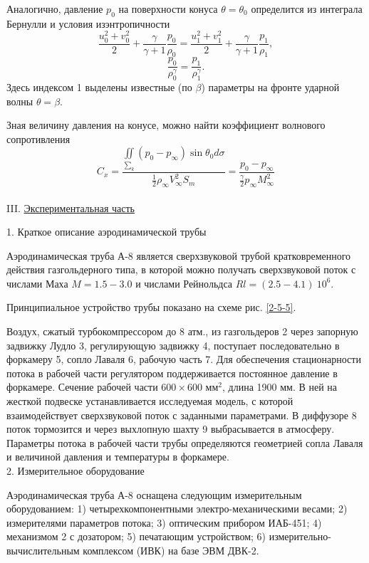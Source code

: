 \documentclass[specialist, subf, href, colorlinks=true, 14pt, final]{disser}
\theoremstyle{definition}
\newcommand{\npart}[2]{\noindent #1. \underline{#2}}
\begin{document}
Аналогично, давление $p_0$ на поверхности конуса $\theta = \theta_0$ определится из интеграла Бернулли и условия изэнтропичности
\[
  \frac{u_0^2 + v_0^2}{2} + \frac{\gamma}{\gamma + 1} \frac{p_0}{\rho_0} = \frac{u_1^2 + v_1^2}{2} + \frac{\gamma}{\gamma + 1}\frac{p_1}{\rho_1},
\]
\[
  \frac{p_0}{\rho_0^{\gamma}} = \frac{p_1}{\rho_1^{\gamma}}.
\]
Здесь индексом 1 выделены известные (по $\beta$) параметры на фронте ударной волны $\theta = \beta$.

Зная величину давления на конусе, можно найти коэффициент волнового сопротивления
\[
  C_x = \frac{\iint\limits_{\sum_k}(p_0 - p_{\infty})\sin \theta_0 d \sigma}{\displaystyle \frac{1}{2} \rho_{\infty} V^2_{\infty} S_m} = \frac{p_0 - p_{\infty}}{\displaystyle \frac{\gamma}{2} p_{\infty} M^2_{\infty}}
\]
\\
\npart{III}{Экспериментальная часть}

1. Краткое описание аэродинамической трубы

Аэродинамическая труба А-8 является сверхзвуковой трубой кратковременного действия газгольдерного типа, в которой можно получать сверхзвуковой поток с числами Маха $M = 1.5 - 3.0$ и числами Рейнольдса $Rl = (2.5 - 4.1)\ 10^6$.

Принципиальное устройство трубы показано на схеме рис. \ref{2-5-5}.

Воздух, сжатый турбокомпрессором до 8 атм., из газгольдеров 2 через запорную задвижку Лудло 3, регулирующую задвижку 4, поступает последовательно в форкамеру 5, сопло Лаваля 6, рабочую часть 7. Для обеспечения стационарности потока в рабочей части регулятором поддерживается постоянное давление в форкамере. Сечение рабочей части $600\times 600$ мм$^2$, длина 1900 мм. В ней на жесткой подвеске устанавливается исследуемая модель, с которой взаимодействует сверхзвуковой поток с заданными параметрами. В диффузоре 8 поток тормозится и через выхлопную шахту 9 выбрасывается в атмосферу. Параметры потока в рабочей части трубы определяются геометрией сопла Лаваля и величиной давления и температуры в форкамере.\\

2. Измерительное оборудование

Аэродинамическая труба А-8 оснащена следующим измерительным оборудованием: 1) четырехкомпонентными электро-механическими весами; 2) измерителями параметров потока; 3) оптическим прибором ИАБ-451; 4) механизмом 2 с дозатором; 5) печатающим устройством; 6) измерительно-вычислительным комплексом (ИВК) на базе ЭВМ ДВК-2.
\end{document}
